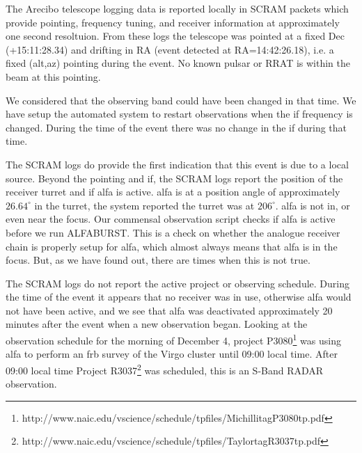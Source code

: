 \documentclass[a4paper,fleqn,usenatbib]{mnras}
\begin{document}
The Arecibo telescope logging data is reported locally in SCRAM packets which
provide pointing, frequency tuning, and receiver information at approximately
one second resoltuion. From these logs the telescope was pointed at a fixed Dec
(+15:11:28.34) and drifting in RA (event detected at RA=14:42:26.18), i.e. a
fixed (alt,az) pointing during the event. No known pulsar or RRAT is within the
beam at this pointing.

We considered that the observing band could have been changed in that time.  We
have setup the automated system to restart observations when the \gls{if}
frequency is changed.  During the time of the event there was no change in the
\gls{if} during that time.

The SCRAM logs do provide the first indication that this event is due to a local
source. Beyond the pointing and \gls{if}, the SCRAM logs report the position of
the receiver turret and if \gls{alfa} is active. \gls{alfa} is at a position
angle of approximately $26.64^{\circ}$ in the turret, the system reported the
turret was at $206^{\circ}$. \gls{alfa} is not in, or even near the focus.  Our
commensal observation script checks if \gls{alfa} is active before we run
ALFABURST. This is a check on whether the analogue receiver chain is properly
setup for \gls{alfa}, which almost always means that \gls{alfa} is in the focus.
But, as we have found out, there are times when this is not true.

The SCRAM logs do not report the active project or observing schedule. During
the time of the event it appears that no receiver was in use, otherwise
\gls{alfa} would not have been active, and we see that \gls{alfa} was
deactivated approximately 20 minutes after the event when a new observation
began.  Looking at the observation schedule for the morning of December 4,
project
P3080\footnote{http://www.naic.edu/vscience/schedule/tpfiles/MichillitagP3080tp.pdf}
was using \gls{alfa} to perform an \gls{frb} survey of the Virgo cluster until
09:00 local time.  After 09:00 local time Project
R3037\footnote{http://www.naic.edu/vscience/schedule/tpfiles/TaylortagR3037tp.pdf}
was scheduled, this is an S-Band RADAR observation.

\end{document}
